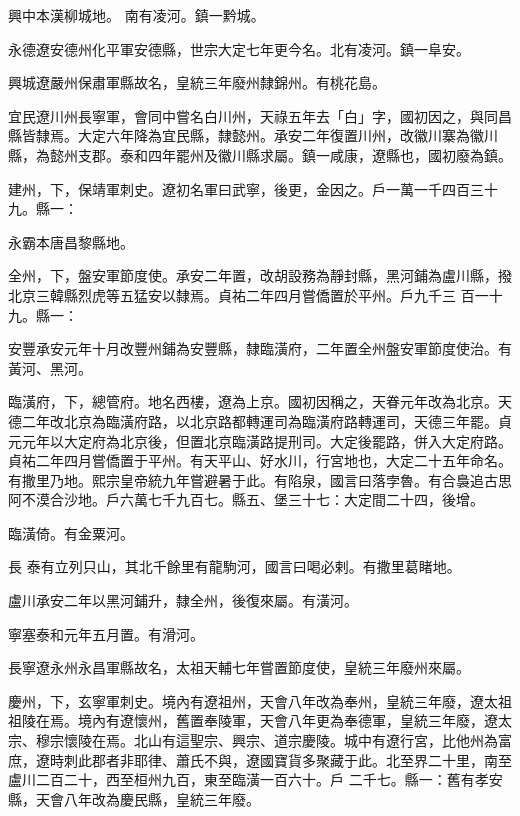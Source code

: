 \begin{pinyinscope}
 興中本漢柳城地。
 南有凌河。鎮一黔城。



 永德遼安德州化平軍安德縣，世宗大定七年更今名。北有凌河。鎮一阜安。



 興城遼嚴州保肅軍縣故名，皇統三年廢州隸錦州。有桃花島。



 宜民遼川州長寧軍，會同中嘗名白川州，天祿五年去「白」字，國初因之，與同昌縣皆隸焉。大定六年降為宜民縣，隸懿州。承安二年復置川州，改徽川寨為徽川縣，為懿州支郡。泰和四年罷州及徽川縣求屬。鎮一咸康，遼縣也，國初廢為鎮。



 建州，下，保靖軍刺史。遼初名軍曰武寧，後更，金因之。戶一萬一千四百三十九。縣一：



 永霸本唐昌黎縣地。



 全州，下，盤安軍節度使。承安二年置，改胡設務為靜封縣，黑河鋪為盧川縣，撥北京三韓縣烈虎等五猛安以隸焉。貞祐二年四月嘗僑置於平州。戶九千三
 百一十九。縣一：



 安豐承安元年十月改豐州鋪為安豐縣，隸臨潢府，二年置全州盤安軍節度使治。有黃河、黑河。



 臨潢府，下，總管府。地名西樓，遼為上京。國初因稱之，天眷元年改為北京。天德二年改北京為臨潢府路，以北京路都轉運司為臨潢府路轉運司，天德三年罷。貞元元年以大定府為北京後，但置北京臨潢路提刑司。大定後罷路，併入大定府路。貞祐二年四月嘗僑置于平州。有天平山、好水川，行宮地也，大定二十五年命名。有撒里乃地。熙宗皇帝統九年嘗避暑于此。有陷泉，國言曰落孛魯。有合裊追古思阿不漠合沙地。戶六萬七千九百七。縣五、堡三十七：大定間二十四，後增。



 臨潢倚。有金粟河。



 長
 泰有立列只山，其北千餘里有龍駒河，國言曰喝必剌。有撒里葛睹地。



 盧川承安二年以黑河鋪升，隸全州，後復來屬。有潢河。



 寧塞泰和元年五月置。有滑河。



 長寧遼永州永昌軍縣故名，太祖天輔七年嘗置節度使，皇統三年廢州來屬。



 慶州，下，玄寧軍刺史。境內有遼祖州，天會八年改為奉州，皇統三年廢，遼太祖祖陵在焉。境內有遼懷州，舊置奉陵軍，天會八年更為奉德軍，皇統三年廢，遼太宗、穆宗懷陵在焉。北山有這聖宗、興宗、道宗慶陵。城中有遼行宮，比他州為富庶，遼時刺此郡者非耶律、蕭氏不與，遼國寶貨多聚藏于此。北至界二十里，南至盧川二百二十，西至桓州九百，東至臨潢一百六十。戶
 二千七。縣一：舊有孝安縣，天會八年改為慶民縣，皇統三年廢。




\end{pinyinscope}
